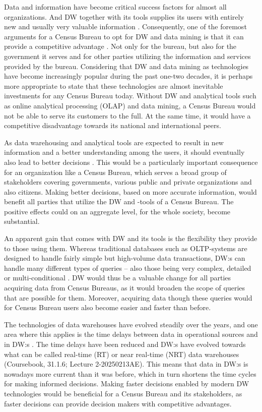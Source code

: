 Data and information have become critical success factors for almost all organizations. 
And DW together with its tools supplies its users with entirely new and usually very valuable information \cite[chapter~31.1.3]{CourseLitt}. 
Consequently, one of the foremost arguments for a Census Bureau to opt for DW and data mining is that it can provide a competitive advantage \cite{l2video}. 
Not only for the bureau, but also for the government it serves and for other parties utilizing the information and services provided by the bureau. 
Considering that DW and data mining as technologies have become increasingly popular during the past one-two decades, 
it is perhaps more appropriate to state that these technologies are almost inevitable investments for any Census Bureau today. 
Without DW and analytical tools such as online analytical processing (OLAP) and data mining, 
a Census Bureau would not be able to serve its customers to the full. 
At the same time, it would have a competitive disadvantage towards its national and international peers.

As data warehousing and analytical tools are expected to result in new information and a better understanding among the users,
it should eventually also lead to better decisions \cite[chapter~31.1.3]{CourseLitt}. 
This would be a particularly important consequence for an organization like a Census Bureau, 
which serves a broad group of stakeholders covering governments, 
various public and private organizations and also citizens. 
Making better decisions, based on more accurate information, would benefit all parties that utilize the DW and -tools of a Census Bureau. 
The positive effects could on an aggregate level, for the whole society, become substantial.

An apparent gain that comes with DW and its tools is the flexibility they provide to those using them. 
Whereas traditional databases such as OLTP-systems are designed to handle fairly simple but high-volume data transactions, DW:s can handle many
different types of queries -- also those being very complex, detailed or multi-conditional \cite[chapter~31.1.4]{CourseLitt}. 
DW would thus be a valuable change for all parties acquiring data from Census Bureaus, 
as it would broaden the scope of queries that are possible for them. 
Moreover, acquiring data though these queries would for Census Bureau users also become easier and faster than before.

The technologies of data warehouses have evolved steadily over the years, 
and one area where this applies is the time delays between data in operational sources and in DW:s \cite[chapter~31.1.6]{CourseLitt}. 
The time delays have been reduced and DW:s have evolved towards what can be called real-time (RT) or near real-time (NRT) data warehouses (Coursebook, 31.1.6; Lecture 2-20250213AE). 
This means that data in DW:s is nowadays more current than it was before, 
which in turn shortens the time cycles for making informed decisions. 
Making faster decisions enabled by modern DW technologies would be beneficial for a Census Bureau and its stakeholders, 
as faster decisions can provide decision makers with competitive advantages.

